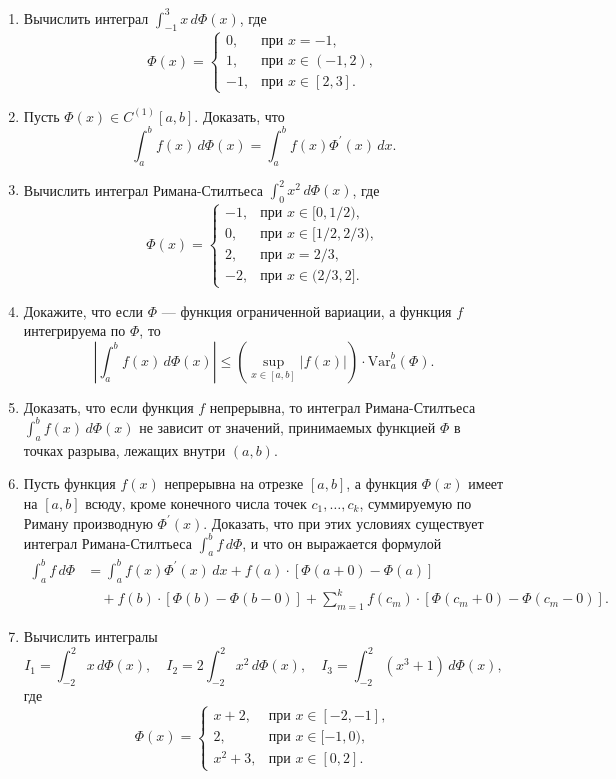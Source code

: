 \documentclass[12pt,a4paper]{article}
\begin{document}
\begin{enumerate}
\item Вычислить интеграл $\int_{-1}^{3} x \, d\Phi(x)$, где
$$\Phi(x) =
\begin{cases} 0, & \text{при } x=-1, \\ 1, & \text{при } x\in(-1, 2), \\ -1, & \text{при } x\in[2, 3].
\end{cases}$$

\item Пусть $\Phi(x) \in C^{(1)}[a, b]$. Доказать, что
$$\int_{a}^{b} f(x) \, d\Phi(x) = \int_{a}^{b} f(x)\Phi^{\prime}(x) \, dx.$$

\item Вычислить интеграл Римана-Стилтьеса $\int_{0}^{2} x^{2} \, d\Phi(x)$, где
$$\Phi(x) =
\begin{cases} -1, & \text{при } x\in[0, 1/2), \\ 0, & \text{при } x\in[1/2, 2/3), \\ 2, & \text{при } x=2/3, \\ -2, & \text{при } x\in(2/3, 2].
\end{cases}$$

\item Докажите, что если $\Phi$ — функция ограниченной вариации, а функция $f$ интегрируема по $\Phi$, то
$$\left| \int_{a}^{b} f(x) \, d\Phi(x) \right| \le \left(\sup_{x\in[a, b]} |f(x)|\right) \cdot \text{Var}_{a}^{b}(\Phi).$$

\item Доказать, что если функция $f$ непрерывна, то интеграл Римана-Стилтьеса $\int_{a}^{b} f(x) \, d\Phi(x)$ не зависит от значений, принимаемых функцией $\Phi$ в точках разрыва, лежащих внутри $(a, b)$.

\item Пусть функция $f(x)$ непрерывна на отрезке $[a, b]$, а функция $\Phi(x)$ имеет на $[a, b]$ всюду, кроме конечного числа точек $c_{1}, \dots, c_{k}$, суммируемую по Риману производную $\Phi^{\prime}(x)$. Доказать, что при этих условиях существует интеграл Римана-Стилтьеса $\int_{a}^{b} f \, d\Phi$, и что он выражается формулой
\begin{align*}
\int_{a}^{b} f \, d\Phi &= \int_{a}^{b} f(x)\Phi^{\prime}(x) \, dx + f(a) \cdot [\Phi(a+0) - \Phi(a)] \\
&\quad + f(b) \cdot [\Phi(b) - \Phi(b-0)] + \sum_{m=1}^{k} f(c_{m}) \cdot [\Phi(c_{m}+0) - \Phi(c_{m}-0)].
\end{align*}

\item Вычислить интегралы
$$I_{1} = \int_{-2}^{2} x \, d\Phi(x), \quad I_{2} = 2\int_{-2}^{2} x^{2} \, d\Phi(x), \quad I_{3} = \int_{-2}^{2} (x^{3}+1) \, d\Phi(x),$$
где
$$\Phi(x) =
\begin{cases} x+2, & \text{при } x\in[-2, -1], \\ 2, & \text{при } x\in[-1, 0), \\ x^{2}+3, & \text{при } x\in[0, 2].
\end{cases}$$
\end{enumerate}
\end{document}
